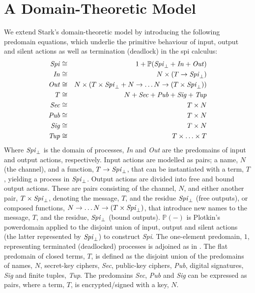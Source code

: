 \documentclass{entcs} \usepackage{entcsmacro}
\begin{document}
\section{A Domain-Theoretic Model\label{sect:denspi}}
We extend Stark's domain-theoretic model \cite{stark1} by introducing the following predomain equations, which underlie the primitive behaviour of input, output and silent actions as well as termination (deadlock) in the spi calculus:
\begin{eqnarray}
\mbox{{\itshape Spi\/}}&\cong&1+\mathbb{P}(\mbox{{\itshape Spi\/}}_\bot+\mbox{{\itshape In\/}}+\mbox{{\itshape Out\/}})\\
\mbox{{\itshape In\/}}&\cong&N\times(T\to\mbox{{\itshape Spi\/}}_\bot)\\
\mbox{{\itshape Out\/}}&\cong&N\times(T\times\mbox{{\itshape Spi\/}}_\bot+N\to\ldots N\to(T\times\mbox{{\itshape Spi\/}}_\bot))\\
T&\cong&N+\mbox{{\itshape Sec\/}}+\mbox{{\itshape Pub\/}}+\mbox{{\itshape Sig\/}}+\mbox{{\itshape Tup\/}}\\
\mbox{{\itshape Sec\/}}&\cong&T\times N\\
\mbox{{\itshape Pub\/}}&\cong&T\times N\\
\mbox{{\itshape Sig\/}}&\cong&T\times N\\
\mbox{{\itshape Tup\/}}&\cong&T\times\ldots\times T
\end{eqnarray}
Where $\mbox{{\itshape Spi\/}}_\bot$ is the domain of processes, {\itshape In\/} and {\itshape Out\/} are the predomains of input and output actions, respectively.  Input actions are modelled as pairs; a name, $N$ (the channel), and a function, $T\to\mbox{{\itshape Spi\/}}_\bot$, that can be instantiated with a term, $T$, yielding a process in $\mbox{{\itshape Spi\/}}_\bot$. Output actions are divided into free and bound output actions.  These are pairs consisting of the channel, $N$, and either another pair, $T\times\mbox{{\itshape Spi\/}}_\bot$, denoting the message, $T$, and the residue $\mbox{{\itshape Spi\/}}_\bot$ (free outputs), or composed functions, $ N\to\ldots N\to(T\times\mbox{{\itshape Spi\/}}_\bot)$, that introduce new names to the message, $T$, and the residue, $\mbox{{\itshape Spi\/}}_\bot$ (bound outputs).  $\mathbb{P}(-)$ is Plotkin's powerdomain applied to the disjoint union of input, output and silent actions (the latter represented by $\mbox{{\itshape Spi\/}}_\bot$) to construct {\itshape Spi\/}.  The one-element predomain, $1$, representing terminated (deadlocked) processes is adjoined as in \cite[Def. 3.4]{abramsky1}. The flat predomain of closed terms, $T$, is defined as the disjoint union of the predomains of names, $N$, secret-key ciphers, {\itshape Sec\/}, public-key ciphers, {\itshape Pub\/}, digital signatures, {\itshape Sig\/} and finite tuples, {\itshape Tup\/}.  The predomains {\itshape Sec\/}, {\itshape Pub\/} and {\itshape Sig\/} can be expressed as pairs, where a term, $T$, is encrypted/signed with a key, $N$.
\end{document}

